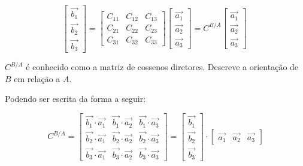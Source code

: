 \begin{equation}
\begin{bmatrix}
\vec{b_1} \\ \vec{b_2} \\ \vec{b_3}
\end{bmatrix}
=
\begin{bmatrix}
C_{11} & C_{12} & C_{13} \\ C_{21} & C_{22} & C_{23} \\ C_{31} & C_{32} & C_{33}
\end{bmatrix}
\begin{bmatrix}
\vec{a_1} \\ \vec{a_2} \\ \vec{a_3}
\end{bmatrix}
=
C^{B/A}
\begin{bmatrix}
\vec{a_1} \\ \vec{a_2} \\ \vec{a_3}
\end{bmatrix} \;
\end{equation}

\begin{math}C^{B/A}\end{math} é conhecido como a matriz de cossenos diretores. Descreve a orientação de \begin{math}B\end{math} em relação a \begin{math}A\end{math}.

Podendo ser escrita da forma a seguir:

\begin{equation}
C^{B/A}
=\begin{bmatrix}
\vec{b_1}\cdot \vec{a_1} & \vec{b_1}\cdot \vec{a_2} & \vec{b_1}\cdot \vec{a_3} \\ \vec{b_2}\cdot \vec{a_1} & \vec{b_2}\cdot \vec{a_2} & \vec{b_2}\cdot \vec{a_3} \\ \vec{b_3}\cdot \vec{a_1} & \vec{b_3}\cdot \vec{a_2} & \vec{b_3}\cdot \vec{a_3}
\end{bmatrix}=
\begin{bmatrix}
\vec{b_1} \\ \vec{b_2} \\ \vec{b_3}
\end{bmatrix}
\cdot
\begin{bmatrix}
\vec{a_1} & \vec{a_2} & \vec{a_3}
\end{bmatrix}
\end{equation}

